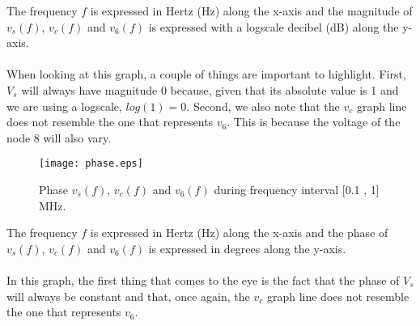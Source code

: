 The frequency $f$ is expressed in Hertz (Hz) along the x-axis and 
the magnitude of $v_s(f)$,  $v_c(f)$  and $v_6(f)$ is expressed with a logscale decibel (dB) along the y-axis.\\ \\
When looking at this graph, a couple of things are important to highlight. First, $V_s$ will always have magnitude 0 because, given that its absolute value is 1 and we are using a logscale, $log(1)=0$. Second, we also note that the $v_c$ graph line does not resemble the one that represents $v_6$. This is because the voltage of the node 8 will also vary. 


\begin{figure}[H] \centering
\texttt{[image: phase.eps]}
\caption{Phase $v_s(f)$,  $v_c(f)$  and $v_6(f)$ during frequency interval [0.1 , 1] MHz.}
\label{fig:phasetheo}
\end{figure}

The frequency $f$ is expressed in Hertz (Hz) along the x-axis and
the phase of $v_s(f)$,  $v_c(f)$  and $v_6(f)$ is expressed in degrees along the y-axis.\\ \\
In this graph, the first thing that comes to the eye is the fact that the phase of $V_s$ will always be constant and that, once again, the $v_c$ graph line does not resemble the one that represents $v_6$. 

